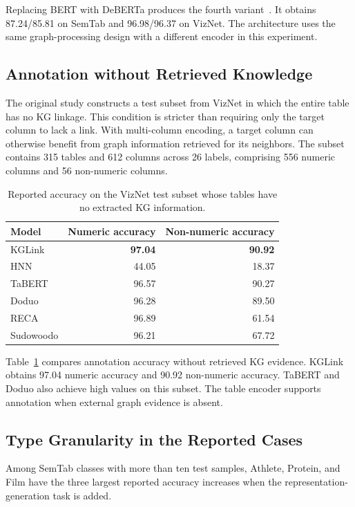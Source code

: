 Replacing BERT with DeBERTa produces the fourth variant~\cite{kglink-he2020deberta}. It obtains 87.24/85.81 on SemTab and 96.98/96.37 on VizNet. The architecture uses the same graph-processing design with a different encoder in this experiment.

\subsection{Annotation without Retrieved Knowledge}
\label{sec:kglink:no-kg}

The original study constructs a test subset from VizNet in which the entire table has no KG linkage. This condition is stricter than requiring only the target column to lack a link. With multi-column encoding, a target column can otherwise benefit from graph information retrieved for its neighbors. The subset contains 315 tables and 612 columns across 26 labels, comprising 556 numeric columns and 56 non-numeric columns.

\begin{table}[tbp]
\centering
\caption{Reported accuracy on the VizNet test subset whose tables have no extracted KG information.}
\label{tab:kglink:no-kg}
\begin{tabular}{lrr}
\toprule
Model&Numeric accuracy&Non-numeric accuracy\\
\midrule
KGLink&\textbf{97.04}&\textbf{90.92}\\
HNN&44.05&18.37\\
TaBERT&96.57&90.27\\
Doduo&96.28&89.50\\
RECA&96.89&61.54\\
Sudowoodo&96.21&67.72\\
\bottomrule
\end{tabular}
\end{table}

Table~\ref{tab:kglink:no-kg} compares annotation accuracy without retrieved KG evidence. KGLink obtains 97.04 numeric accuracy and 90.92 non-numeric accuracy. TaBERT and Doduo also achieve high values on this subset. The table encoder supports annotation when external graph evidence is absent.

\subsection{Type Granularity in the Reported Cases}
\label{sec:kglink:qualitative}

Among SemTab classes with more than ten test samples, Athlete, Protein, and Film have the three largest reported accuracy increases when the representation-generation task is added.


